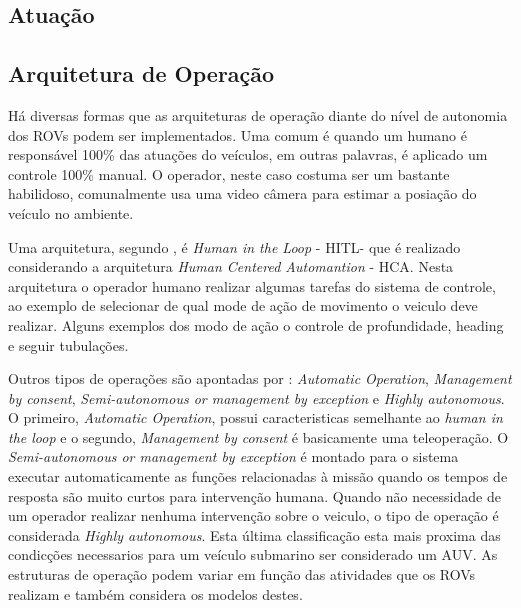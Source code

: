 \subsection{Atuação}

\subsection{Arquitetura de Operação}
Há diversas formas que as arquiteturas de operação diante do nível de autonomia dos ROVs podem ser implementados. Uma comum é quando um humano é responsável 100\% das atuações do veículos, em outras palavras, é aplicado um controle 100\% manual. O operador, neste caso costuma ser um bastante habilidoso, comunalmente usa uma video câmera para estimar a posiação do veículo no ambiente.


Uma arquitetura, segundo \cite{wireless_joy}, é \textit{Human in the Loop} - HITL- que é realizado considerando a arquitetura \textit{Human Centered Automantion} - HCA. Nesta arquitetura o operador humano realizar algumas tarefas do sistema de controle, ao exemplo de selecionar de qual mode de ação de movimento o veiculo deve realizar. Alguns exemplos dos modo de ação o controle de profundidade, heading e seguir tubulações.

Outros tipos de operações são apontadas por \cite{Towards}: \textit{Automatic Operation}, \textit{Management by consent}, \textit{Semi-autonomous or management by exception} e \textit{Highly autonomous}. O primeiro, \textit{Automatic Operation}, possui caracteristicas semelhante ao \textit{human in the loop} e o segundo, \textit{Management by consent} é basicamente uma teleoperação. O \textit{Semi-autonomous or management by exception} é montado para o sistema executar automaticamente as funções relacionadas à missão quando os tempos de resposta são muito curtos para intervenção humana.  Quando não necessidade de um operador realizar nenhuma intervenção sobre o veiculo, o tipo de operação é considerada \textit{Highly autonomous}. Esta última classificação esta mais proxima das condicções necessarios para um veículo submarino ser considerado um AUV. As estruturas de operação podem variar em função das atividades que os ROVs realizam e também considera os modelos destes. 








